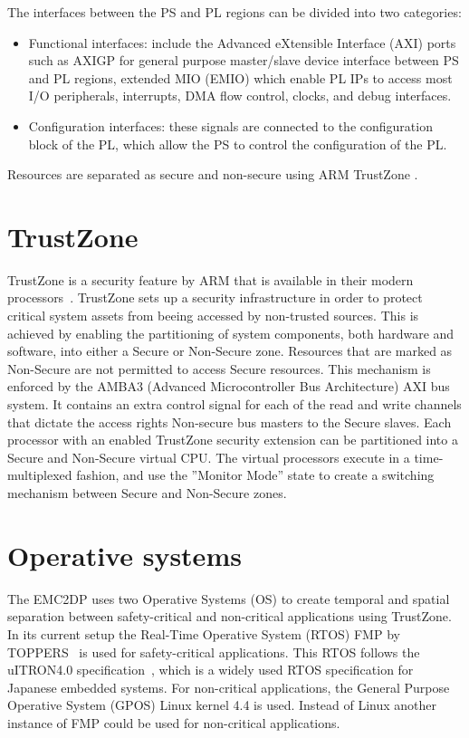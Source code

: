 The interfaces between the PS and PL regions can be divided into two categories: 
\begin{itemize}
\item Functional interfaces: include the Advanced eXtensible Interface (AXI) ports such as AXIGP for general purpose master/slave device interface between PS and PL regions, extended MIO (EMIO) which enable PL IPs to access most I/O peripherals, interrupts, DMA flow control, clocks, and debug interfaces.
\item Configuration interfaces: these signals are connected to the configuration block of the PL, which allow the PS to control the configuration of the PL. %
\end{itemize}

Resources are separated as secure and non-secure using ARM TrustZone \cite{website:ARM}.\\

\section{TrustZone}
\label{sec:trustzone}
TrustZone is a security feature by ARM that is available in their modern processors~\cite{website:ARM}. TrustZone sets up a security infrastructure in order to protect critical system assets from beeing accessed by non-trusted sources. This is achieved by enabling the partitioning of system components, both hardware and software, into either a Secure or Non-Secure zone. Resources that are marked as Non-Secure are not permitted to access Secure resources. This mechanism is enforced by the AMBA3 (Advanced Microcontroller Bus Architecture) AXI bus system. It contains an extra control signal for each of the read and write channels that dictate the access rights Non-secure bus masters to the Secure slaves. Each processor with an enabled TrustZone security extension can be partitioned into a Secure and Non-Secure virtual CPU. The virtual processors execute in a time-multiplexed fashion, and use the ”Monitor Mode” state to create a switching mechanism between Secure and Non-Secure zones.~\cite{zaki2016} \\ %

\section{Operative systems}
The EMC2DP uses two Operative Systems (OS) to create temporal and spatial separation between safety-critical and non-critical applications using TrustZone. In its current setup the Real-Time Operative System (RTOS) FMP by TOPPERS~\cite{website:fmp} is used for safety-critical applications. This RTOS follows the uITRON4.0 specification~\cite{uitron}, which is a widely used RTOS specification for Japanese embedded systems. For non-critical applications, the General Purpose Operative System (GPOS) Linux kernel 4.4 is used. Instead of Linux another instance of FMP could be used for non-critical applications.\\

